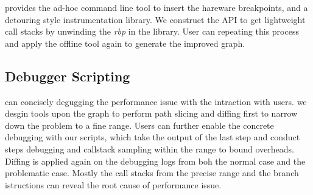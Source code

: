 \xxx provides the ad-hoc command line tool to insert the hareware breakpoints, and a detouring style instrumentation library.
We construct the API to get lightweight call stacks by unwinding the \emph{rbp} in the library.
User can repeating this process and apply the offline tool again to generate the improved graph. 

\subsection{Debugger Scripting}
\xxx can concisely degugging the performance issue with the intraction with users.
we desgin tools upon the graph to perform path slicing and diffing first to narrow down the problem to a fine range.
Users can further enable the concrete debugging with our scripts, which take the output of the last step and conduct steps debugging and callstack sampling within the range to bound overheads.
Diffing is applied again on the debugging logs from boh the normal case and the problematic case.
Mostly the call stacks from the precise range and the branch istructions can reveal the root cause of performance issue.

